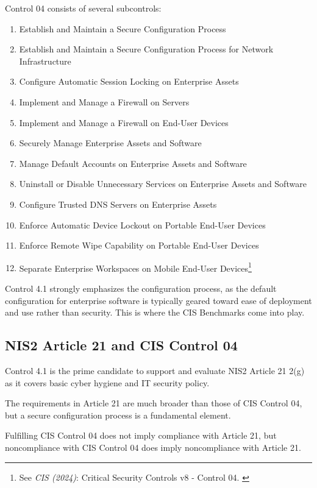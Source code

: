 Control 04 consists of several subcontrols:

\begin{enumerate}
    \item Establish and Maintain a Secure Configuration Process
    \item Establish and Maintain a Secure Configuration Process for
Network Infrastructure
    \item Configure Automatic Session Locking on Enterprise Assets
    \item Implement and Manage a Firewall on Servers
    \item Implement and Manage a Firewall on End-User Devices
    \item Securely Manage Enterprise Assets and Software
    \item Manage Default Accounts on Enterprise Assets and Software
    \item Uninstall or Disable Unnecessary Services on Enterprise Assets
and Software
    \item Configure Trusted DNS Servers on Enterprise Assets
    \item Enforce Automatic Device Lockout on Portable End-User Devices
    \item Enforce Remote Wipe Capability on Portable End-User Devices
    \item Separate Enterprise Workspaces on Mobile End-User Devices\footnote{See \textit{CIS (2024)}: Critical Security Controls v8 - Control 04. \cite{cisControls}}
\end{enumerate}

Control 4.1 strongly emphasizes the configuration process, as the default configuration for enterprise software is typically geared toward ease of deployment and use rather than security. This is where the CIS Benchmarks come into play.

\subsection{NIS2 Article 21 and CIS Control 04}

Control 4.1 is the prime candidate to support and evaluate NIS2 Article 21 2(g) as it covers basic cyber hygiene and IT security policy.

The requirements in Article 21 are much broader than those of CIS Control 04, but a secure configuration process is a fundamental element.

Fulfilling CIS Control 04 does not imply compliance with Article 21, but noncompliance with CIS Control 04 does imply noncompliance with Article 21.

